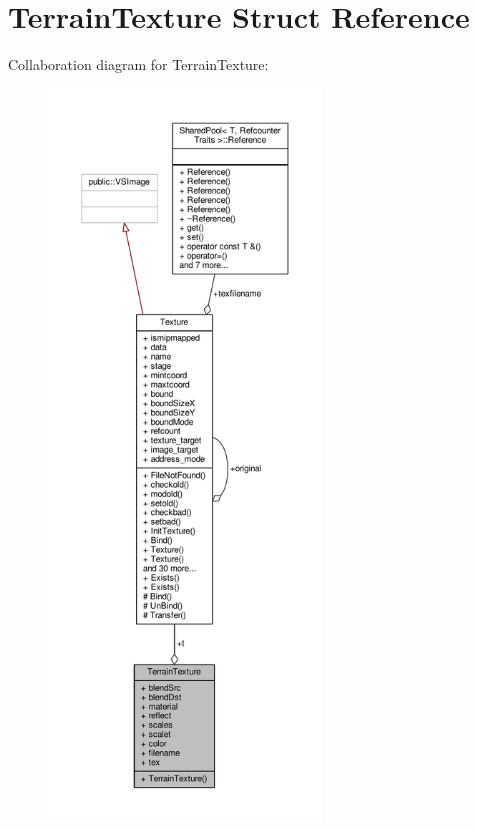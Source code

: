 \hypertarget{structTerrainTexture}{}\section{Terrain\+Texture Struct Reference}
\label{structTerrainTexture}


Collaboration diagram for Terrain\+Texture\+:
\nopagebreak
\begin{figure}[H]
\begin{center}
\leavevmode
\includegraphics[height=550pt]{d1/d7c/structTerrainTexture__coll__graph}
\end{center}
\end{figure}
